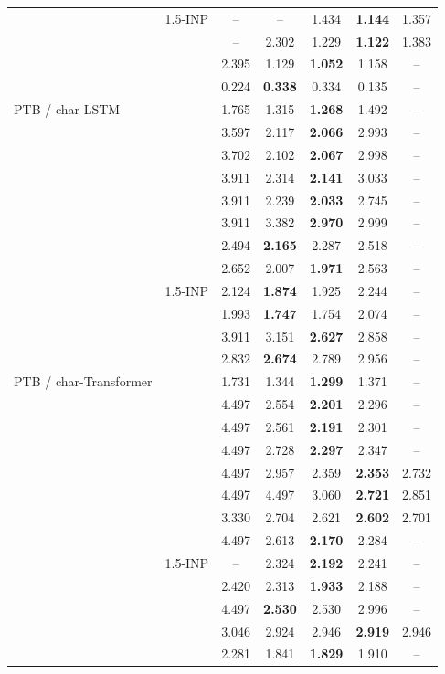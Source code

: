 \begin{tabular}{l l ccccc}
 & 1.5-INP & -- & -- & 1.434 & \textbf{1.144} & 1.357 \\
 & \DUST{} & -- & 2.302 & 1.229 & \textbf{1.122} & 1.383 \\
 & \DANP{} & 2.395 & 1.129 & \textbf{1.052} & 1.158 & -- \\
 & \FF{} & 0.224 & \textbf{0.338} & 0.334 & 0.135 & -- \\
\midrule
PTB / char-LSTM & \BP{} & 1.765 & 1.315 & \textbf{1.268} & 1.492 & -- \\
 & \SPSA{} & 3.597 & 2.117 & \textbf{2.066} & 2.993 & -- \\
 & \SPSAb{} & 3.702 & 2.102 & \textbf{2.067} & 2.998 & -- \\
 & \RS{} & 3.911 & 2.314 & \textbf{2.141} & 3.033 & -- \\
 & \NP{} & 3.911 & 2.239 & \textbf{2.033} & 2.745 & -- \\
 & \ANP{} & 3.911 & 3.382 & \textbf{2.970} & 2.999 & -- \\
 & \ANPb{} & 2.494 & \textbf{2.165} & 2.287 & 2.518 & -- \\
 & \INP{} & 2.652 & 2.007 & \textbf{1.971} & 2.563 & -- \\
 & 1.5-INP & 2.124 & \textbf{1.874} & 1.925 & 2.244 & -- \\
 & \DUST{} & 1.993 & \textbf{1.747} & 1.754 & 2.074 & -- \\
 & \DANP{} & 3.911 & 3.151 & \textbf{2.627} & 2.858 & -- \\
 & \FF{} & 2.832 & \textbf{2.674} & 2.789 & 2.956 & -- \\
\midrule
PTB / char-Transformer & \BP{} & 1.731 & 1.344 & \textbf{1.299} & 1.371 & -- \\
 & \SPSA{} & 4.497 & 2.554 & \textbf{2.201} & 2.296 & -- \\
 & \SPSAb{} & 4.497 & 2.561 & \textbf{2.191} & 2.301 & -- \\
 & \RS{} & 4.497 & 2.728 & \textbf{2.297} & 2.347 & -- \\
 & \NP{} & 4.497 & 2.957 & 2.359 & \textbf{2.353} & 2.732 \\
 & \ANP{} & 4.497 & 4.497 & 3.060 & \textbf{2.721} & 2.851 \\
 & \ANPb{} & 3.330 & 2.704 & 2.621 & \textbf{2.602} & 2.701 \\
 & \INP{} & 4.497 & 2.613 & \textbf{2.170} & 2.284 & -- \\
 & 1.5-INP & -- & 2.324 & \textbf{2.192} & 2.241 & -- \\
 & \DUST{} & 2.420 & 2.313 & \textbf{1.933} & 2.188 & -- \\
 & \DANP{} & 4.497 & \textbf{2.530} & 2.530 & 2.996 & -- \\
 & \FF{} & 3.046 & 2.924 & 2.946 & \textbf{2.919} & 2.946 \\
 & \IPC{} & 2.281 & 1.841 & \textbf{1.829} & 1.910 & -- \\
\bottomrule
\end{tabular}
